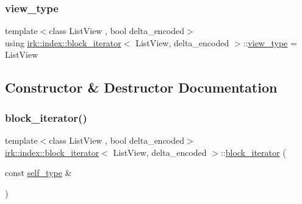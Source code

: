 \subsubsection{\texorpdfstring{view\+\_\+type}{view\_type}}
{\footnotesize\ttfamily template$<$class List\+View , bool delta\+\_\+encoded$>$ \\
using \mbox{\hyperlink{classirk_1_1index_1_1block__iterator}{irk\+::index\+::block\+\_\+iterator}}$<$ List\+View, delta\+\_\+encoded $>$\+::\mbox{\hyperlink{classirk_1_1index_1_1block__iterator_a75bc89b691db97f719af7284ee91afa0}{view\+\_\+type}} =  List\+View}



\subsection{Constructor \& Destructor Documentation}
\mbox{\label{classirk_1_1index_1_1block__iterator_a00174f254405749a39d2009b2a6819bf}} 
\subsubsection{\texorpdfstring{block\+\_\+iterator()}{block\_iterator()}\hspace{0.1cm}{\footnotesize\ttfamily [1/3]}}
{\footnotesize\ttfamily template$<$class List\+View , bool delta\+\_\+encoded$>$ \\
\mbox{\hyperlink{classirk_1_1index_1_1block__iterator}{irk\+::index\+::block\+\_\+iterator}}$<$ List\+View, delta\+\_\+encoded $>$\+::\mbox{\hyperlink{classirk_1_1index_1_1block__iterator}{block\+\_\+iterator}} (\begin{DoxyParamCaption}\item[{const \mbox{\hyperlink{classirk_1_1index_1_1block__iterator_a338ee8fee726492e9f8bbad4b4d75766}{self\+\_\+type}} \&}]{ }\end{DoxyParamCaption})\hspace{0.3cm}{\ttfamily [default]}}

\mbox{\label{classirk_1_1index_1_1block__iterator_ab166ce990eeb6efb45506acd57626042}} 
